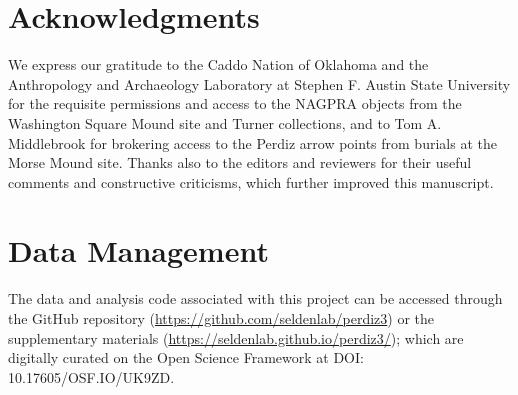 \documentclass[smallextended]{svjour3}       %
\begin{document}
\hypertarget{acknowledgments}{%
\section*{Acknowledgments}\label{acknowledgments}}

We express our gratitude to the Caddo Nation of Oklahoma and the
Anthropology and Archaeology Laboratory at Stephen F. Austin State
University for the requisite permissions and access to the NAGPRA
objects from the Washington Square Mound site and Turner collections,
and to Tom A. Middlebrook for brokering access to the Perdiz arrow
points from burials at the Morse Mound site. Thanks also to the editors
and reviewers for their useful comments and constructive criticisms,
which further improved this manuscript.

\hypertarget{data-management}{%
\section*{Data Management}\label{data-management}}

The data and analysis code associated with this project can be accessed
through the GitHub repository
(\url{https://github.com/seldenlab/perdiz3}) or the supplementary
materials (\url{https://seldenlab.github.io/perdiz3/}); which are
digitally curated on the Open Science Framework at \newline DOI:
10.17605/OSF.IO/UK9ZD.




\end{document}

